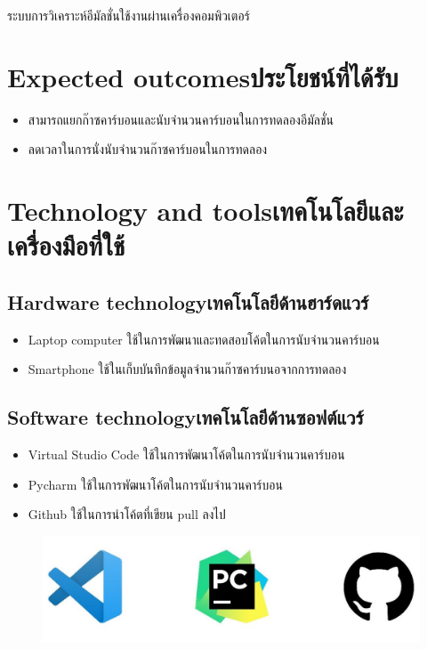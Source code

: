 \hspace{0.5 cm}ระบบการวิเคราะห์อีมัลชั่นใช้งานผ่านเครื่องคอมพิวเตอร์

\section{\ifenglish Expected outcomes\else ประโยชน์ที่ได้รับ\fi}

\begin{itemize}
    \item {สามารถแยกก๊าซคาร์บอนและนับจำนวนคาร์บอนในการทดลองอีมัลชั่น}
    \item {ลดเวลาในการนั่งนับจำนวนก๊าซคาร์บอนในการทดลอง}
\end{itemize}

\section{\ifenglish Technology and tools\else เทคโนโลยีและเครื่องมือที่ใช้\fi}

\subsection{\ifenglish Hardware technology\else เทคโนโลยีด้านฮาร์ดแวร์\fi}
\begin{itemize}
    \item {Laptop computer ใช้ในการพัฒนาและทดสอบโค้ตในการนับจำนวนคาร์บอน}
    \item {Smartphone ใช้ในเก็บบันทึกข้อมูลจำนวนก๊าซคาร์บนอจากการทดลอง}
\end{itemize}

\subsection{\ifenglish Software technology\else เทคโนโลยีด้านซอฟต์แวร์\fi}
\begin{itemize}
    \item {Virtual Studio Code ใช้ในการพัฒนาโค้ตในการนับจำนวนคาร์บอน}
    \item {Pycharm ใช้ในการพัฒนาโค้ตในการนับจำนวนคาร์บอน}
    \item {Github ใช้ในการนำโค้ตที่เขียน pull ลงไป}
\end{itemize}


\begin{figure}[h!]
    \begin{center}
      \includegraphics[width=\textwidth]{Doc1.jpg}
    \end{center}
  \end{figure}


